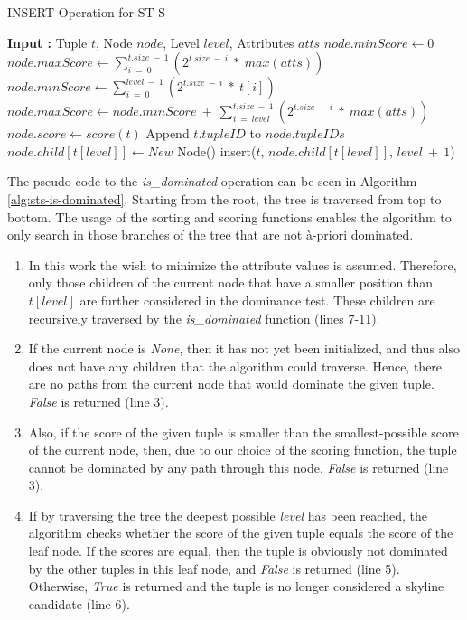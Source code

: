 \begin{algorithm}[h]
	\caption{INSERT Operation for ST-S} \label{alg:sts-insert}
	\begin{algorithmic}[1]		
		\State \textbf{Input :} Tuple $t$, Node $node$, Level $level$, Attributes $atts$
			\State $node.minScore \gets 0$
			\State $node.maxScore \gets \sum_{i~=~0}^{t.size~-~1}(2^{t.size~-~i}~*~max(atts))$
		\Else 
			\State $node.minScore \gets \sum_{i~=~0}^{level~-~1}(2^{t.size~-~i}~*~t[i])$
			\State $node.maxScore \gets node.minScore~+~\sum_{i~=~level}^{t.size~-~1}(2^{t.size~-~i}~*~max(atts))$
		\EndIf
				\State $node.score \gets score(t)$
			\EndIf
			\State Append $t.tupleID$ to $node.tupleIDs$
		\Else
				\State $node.child[t[level]] \gets New$ Node()
			\EndIf
			\State insert($t$, $node.child[t[level]]$, $level~+~1$)
		\EndIf
	\end{algorithmic}
\end{algorithm}

\noindent The pseudo-code to the \textit{is\_dominated} operation can be seen in Algorithm \ref{alg:sts-is-dominated}. Starting from the root, the tree is traversed from top to bottom. The usage of the sorting and scoring functions enables the algorithm to only search in those branches of the tree that are not \`{a}-priori dominated. 
\begin{enumerate}
	\item In this work the wish to minimize the attribute values is assumed. Therefore, only those children of the current node that have a smaller position than $t[level]$ are further considered in the dominance test. These children are recursively traversed by the \textit{is\_dominated} function (lines 7-11). 
	\item If the current node is \textit{None}, then it has not yet been initialized, and thus also does not have any children that the algorithm could traverse. Hence, there are no paths from the current node that would dominate the given tuple. \textit{False} is returned (line 3). 
	\item Also, if the score of the given tuple is smaller than the smallest-possible score of the current node, then, due to our choice of the scoring function, the tuple cannot be dominated by any path through this node. \textit{False} is returned (line 3). 
	\item If by traversing the tree the deepest possible \textit{level} has been reached, the algorithm checks whether the score of the given tuple equals the score of the leaf node. If the scores are equal, then the tuple is obviously not dominated by the other tuples in this leaf node, and \textit{False} is returned (line 5). Otherwise, \textit{True} is returned and the tuple is no longer considered a skyline candidate (line 6). 
\end{enumerate}

